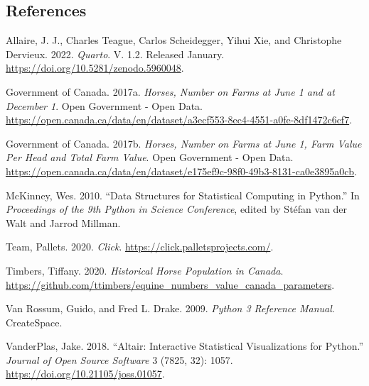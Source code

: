 \documentclass[
  letterpaper,
  DIV=11,
  numbers=noendperiod]{scrartcl}
\newlength{\cslhangindent}
\newenvironment{CSLReferences}[2] %
 {\begin{list}{}{%
  \setlength{\itemindent}{0pt}
  \setlength{\leftmargin}{0pt}
  \setlength{\parsep}{0pt}
  \ifodd #1
   \setlength{\leftmargin}{\cslhangindent}
   \setlength{\itemindent}{-1\cslhangindent}
  \fi
  \setlength{\itemsep}{#2\baselineskip}}}
 {\end{list}}
\begin{document}
\subsection*{References}\label{references}

\protect{}\label{refs}
\begin{CSLReferences}{1}{1}
Allaire, J. J., Charles Teague, Carlos Scheidegger, Yihui Xie, and
Christophe Dervieux. 2022. \emph{{Quarto}}. V. 1.2. Released January.
\url{https://doi.org/10.5281/zenodo.5960048}.

Government of Canada. 2017a. \emph{Horses, Number on Farms at June 1 and
at December 1}. Open Government - Open Data.
\url{https://open.canada.ca/data/en/dataset/a3ecf553-8ec4-4551-a0fe-8df1472c6cf7}.

Government of Canada. 2017b. \emph{Horses, Number on Farms at June 1,
Farm Value Per Head and Total Farm Value}. Open Government - Open Data.
\url{https://open.canada.ca/data/en/dataset/e175ef9c-98f0-49b3-8131-ca0e3895a0cb}.

McKinney, Wes. 2010. {``Data Structures for Statistical Computing in
Python.''} In \emph{Proceedings of the 9th Python in Science
Conference}, edited by Stéfan van der Walt and Jarrod Millman.

Team, Pallets. 2020. \emph{Click}.
\url{https://click.palletsprojects.com/}.

Timbers, Tiffany. 2020. \emph{Historical Horse Population in Canada}.
\url{https://github.com/ttimbers/equine_numbers_value_canada_parameters}.

Van Rossum, Guido, and Fred L. Drake. 2009. \emph{Python 3 Reference
Manual}. CreateSpace.

VanderPlas, Jake. 2018. {``Altair: Interactive Statistical
Visualizations for Python.''} \emph{Journal of Open Source Software} 3
(7825, 32): 1057. \url{https://doi.org/10.21105/joss.01057}.

\end{CSLReferences}
\end{document}
